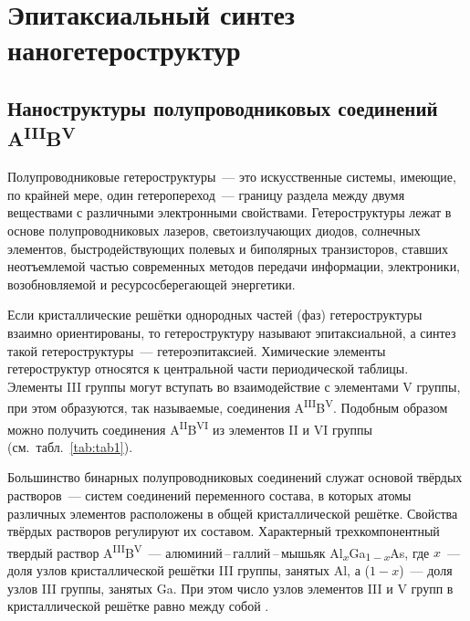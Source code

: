 \chapter{Эпитаксиальный синтез наногетероструктур}\label{ch:ch1}

\section{Наноструктуры полупроводниковых соединений A\textsuperscript{III}B\textsuperscript{V}}\label{sec:ch1/sec1}

Полупроводниковые гетероструктуры~--- это искусственные системы, имеющие, по крайней мере, один гетеропереход~--- границу раздела между двумя веществами с различными электронными свойствами. Гетероструктуры лежат в основе полупроводниковых лазеров, светоизлучающих диодов, солнечных элементов, быстродействующих полевых и биполярных транзисторов, ставших неотъемлемой частью современных методов передачи информации, электроники, возобновляемой и ресурсосберегающей энергетики.

Если кристаллические решётки однородных частей (фаз) гетероструктуры взаимно ориентированы, то гетероструктуру называют эпитаксиальной, а синтез такой гетероструктуры~--- гетероэпитаксией. Химические элементы гетероструктур относятся к центральной части периодической таблицы. Элементы III группы могут вступать во взаимодействие с элементами V группы, при этом образуются, так называемые, соединения A\textsuperscript{III}B\textsuperscript{V}. Подобным образом можно получить соединения A\textsuperscript{II}B\textsuperscript{VI} из элементов II и VI группы (см.~табл.~\cref{tab:tab1}).

Большинство бинарных полупроводниковых соединений служат основой твёрдых растворов~--- систем соединений переменного состава, в которых атомы различных элементов расположены в общей кристаллической решётке. Свойства твёрдых растворов регулируют их составом. Характерный трехкомпонентный твердый раствор A\textsuperscript{III}B\textsuperscript{V}~--- алюминий\,--\,галлий\,--\,мышьяк Al\textsubscript{\(x\)}Ga\textsubscript{\(1 - x\)}As, где \(x\)~--- доля узлов кристаллической решётки III группы, занятых Al, а (\(1 - x\))~--- доля узлов III группы, занятых Ga. При этом число узлов элементов III и V групп в кристаллической решётке равно между собой \cite{Kroemer2001}.

